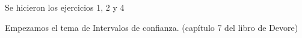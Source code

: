Se hicieron los ejercicios 1, 2 y 4

Empezamos el tema de Intervalos de confianza. (capítulo 7 del libro de Devore)
